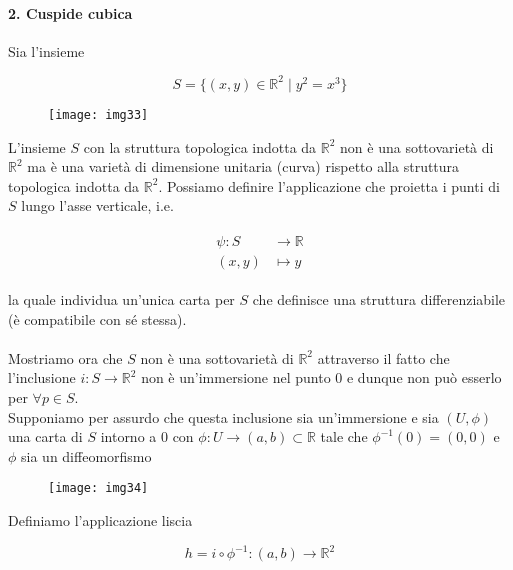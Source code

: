 \paragraph{2. Cuspide cubica}

Sia l'insieme

\begin{equation}
	S = \{ (x,y) \in \mathbb{R}^{2} \mid y^{2}=x^{3} \}
\end{equation}

\begin{figure}[H]
	\centering
	\texttt{[image: img33]}
\end{figure}

L'insieme $ S $ con la struttura topologica indotta da $ \mathbb{R}^{2} $ non è una sottovarietà di $ \mathbb{R}^{2} $ ma è una varietà di dimensione unitaria (curva) rispetto alla struttura topologica indotta da $ \mathbb{R}^{2} $. Possiamo definire l'applicazione che proietta i punti di $ S $ lungo l'asse verticale, i.e.

\begin{align}
	\begin{split}
		\psi : S &\to \mathbb{R}\\
		(x,y) &\mapsto y
	\end{split}
\end{align}

la quale individua un'unica carta per $ S $ che definisce una struttura differenziabile (è compatibile con sé stessa).\\\\
%
Mostriamo ora che $ S $ non è una sottovarietà di $ \mathbb{R}^{2} $ attraverso il fatto che l'inclusione $ i : S \to \mathbb{R}^{2} $ non è un'immersione nel punto 0 e dunque non può esserlo per $ \forall p \in S $.\\
Supponiamo per assurdo che questa inclusione sia un'immersione e sia $ (U,\phi) $ una carta di $ S $ intorno a 0 con $ \phi : U \to (a,b) \subset \mathbb{R} $ tale che $ \phi^{-1}(0)=(0,0) $ e $ \phi $ sia un diffeomorfismo

\begin{figure}[H]
	\centering
	\texttt{[image: img34]}
\end{figure}

Definiamo l'applicazione liscia

\begin{equation}
	h = i \circ \phi^{-1} : (a,b) \to \mathbb{R}^{2}
\end{equation}

